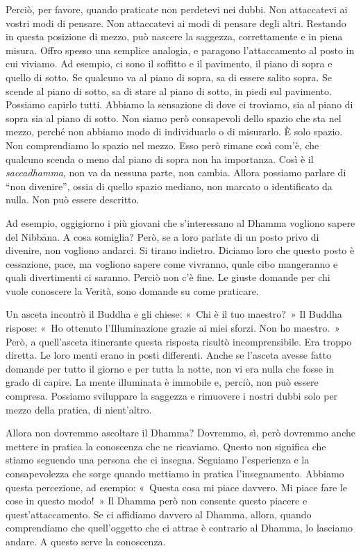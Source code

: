 Perciò, per favore, quando praticate non perdetevi nei dubbi. Non
attaccatevi ai vostri modi di pensare. Non attaccatevi ai modi di
pensare degli altri. Restando in questa posizione di mezzo, può nascere
la saggezza, correttamente e in piena misura. Offro spesso una semplice
analogia, e paragono l'attaccamento al posto in cui viviamo. Ad esempio,
ci sono il soffitto e il pavimento, il piano di sopra e quello di sotto.
Se qualcuno va al piano di sopra, sa di essere salito sopra. Se scende
al piano di sotto, sa di stare al piano di sotto, in piedi sul
pavimento. Possiamo capirlo tutti. Abbiamo la sensazione di dove ci
troviamo, sia al piano di sopra sia al piano di sotto. Non siamo però
consapevoli dello spazio che sta nel mezzo, perché non abbiamo modo di
individuarlo o di misurarlo. È solo spazio. Non comprendiamo lo spazio
nel mezzo. Esso però rimane così com'è, che qualcuno scenda o meno dal
piano di sopra non ha importanza. Così è il \emph{saccadhamma}, non va
da nessuna parte, non cambia. Allora possiamo parlare di ``non
divenire'', ossia di quello spazio mediano, non marcato o identificato
da nulla. Non può essere descritto.

Ad esempio, oggigiorno i più giovani che s'interessano al Dhamma
vogliono sapere del Nibbāna. A cosa somiglia? Però, se a loro
parlate di un posto privo di divenire, non vogliono andarci. Si tirano
indietro. Diciamo loro che questo posto è cessazione, pace, ma vogliono
sapere come vivranno, quale cibo mangeranno e quali divertimenti ci
saranno. Perciò non c'è fine. Le giuste domande per chi vuole conoscere
la Verità, sono domande su come praticare.

Un asceta incontrò il Buddha e gli chiese: «~Chi è il tuo maestro?~» Il
Buddha rispose: «~Ho ottenuto l'Illuminazione grazie ai miei sforzi. Non
ho maestro.~» Però, a quell'asceta itinerante questa risposta risultò
incomprensibile. Era troppo diretta. Le loro menti erano in posti
differenti. Anche se l'asceta avesse fatto domande per tutto il giorno e
per tutta la notte, non vi era nulla che fosse in grado di capire. La
mente illuminata è immobile e, perciò, non può essere compresa. Possiamo
sviluppare la saggezza e rimuovere i nostri dubbi solo per mezzo della
pratica, di nient'altro.

Allora non dovremmo ascoltare il Dhamma? Dovremmo, sì, però dovremmo
anche mettere in pratica la conoscenza che ne ricaviamo. Questo non
significa che stiamo seguendo una persona che ci insegna. Seguiamo
l'esperienza e la consapevolezza che sorge quando mettiamo in pratica
l'insegnamento. Abbiamo questa percezione, ad esempio: «~Questa cosa mi
piace davvero. Mi piace fare le cose in questo modo!~» Il Dhamma però
non consente questo piacere e quest'attaccamento. Se ci affidiamo
davvero al Dhamma, allora, quando comprendiamo che quell'oggetto che ci
attrae è contrario al Dhamma, lo lasciamo andare. A questo serve la
conoscenza.

